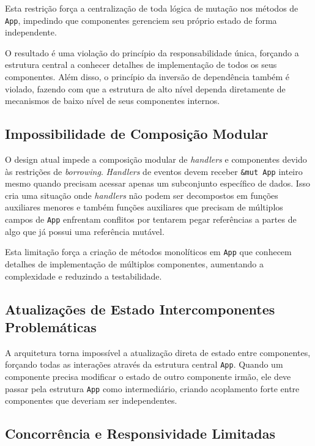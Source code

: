 Esta restrição força a centralização de toda lógica de mutação nos métodos de \texttt{App}, impedindo que componentes gerenciem seu próprio estado de forma independente. 

O resultado é uma violação do princípio da responsabilidade única, forçando a estrutura central a conhecer detalhes de implementação de todos os seus componentes. Além disso, o princípio da inversão de dependência também é violado, fazendo com que a estrutura de alto nível dependa diretamente de mecanismos de baixo nível de seus componentes internos.

\subsection{Impossibilidade de Composição Modular}

O design atual impede a composição modular de \emph{handlers} e componentes devido às restrições de \emph{borrowing}. \emph{Handlers} de eventos devem receber \texttt{\&mut App} inteiro mesmo quando precisam acessar apenas um subconjunto específico de dados. Isso cria uma situação onde \emph{handlers} não podem ser decompostos em funções auxiliares menores e também funções auxiliares que precisam de múltiplos campos de \texttt{App} enfrentam conflitos por tentarem pegar referências a partes de algo que já possui uma referência mutável.

Esta limitação força a criação de métodos monolíticos em \texttt{App} que conhecem detalhes de implementação de múltiplos componentes, aumentando a complexidade e reduzindo a testabilidade.

\subsection{Atualizações de Estado Intercomponentes Problemáticas}

A arquitetura torna impossível a atualização direta de estado entre componentes, forçando todas as interações através da estrutura central \texttt{App}. Quando um componente precisa modificar o estado de outro componente irmão, ele deve passar pela estrutura \texttt{App} como intermediário, criando acoplamento forte entre componentes que deveriam ser independentes.

\subsection{Concorrência e Responsividade Limitadas}

